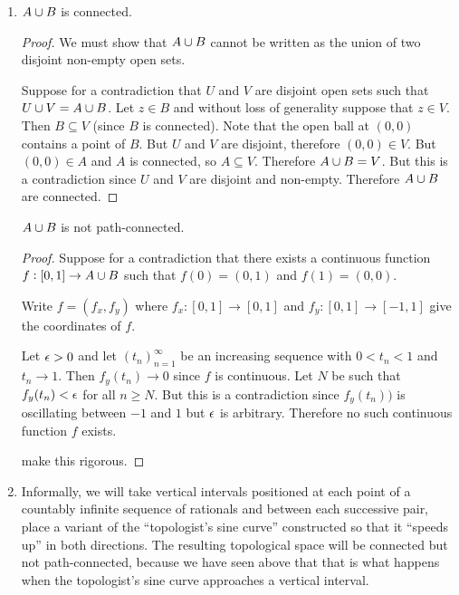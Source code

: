 \begin{enumerate}[label=(\alph*)]
\item
  \begin{claim*}
    $A \cup B$ is connected.
  \end{claim*}

  \begin{proof}
    We must show that $A \cup B$ cannot be written as the union of two disjoint non-empty open sets.

    Suppose for a contradiction that $U$ and $V$ are disjoint open sets such that $U \cup V = A \cup B$.
    Let $z \in B$ and without loss of generality suppose that $z \in V$. Then $B \subseteq V$ (since $B$ is
    connected). Note that the open ball at $(0, 0)$ contains a point of $B$. But $U$ and $V$ are disjoint,
    therefore $(0, 0) \in V$. But $(0, 0) \in A$ and $A$ is connected, so $A \subseteq V$.
    Therefore $A \cup B = V$. But this is a contradiction since $U$ and $V$ are disjoint and non-empty.
    Therefore $A \cup B$ are connected.
  \end{proof}


  \begin{claim*}
    $A \cup B$ is not path-connected.
  \end{claim*}

  \begin{proof}
    Suppose for a contradiction that there exists a continuous function $f: [0, 1] \to A \cup B$ such
    that $f(0) = (0, 1)$ and $f(1) = (0, 0)$.

    Write $f = (f_x, f_y)$ where $f_x: [0, 1] \to [0, 1]$ and $f_y: [0, 1] \to [-1, 1]$ give the coordinates of $f$.

    Let $\epsilon > 0$ and let $(t_n)_{n=1}^\infty$ be an increasing sequence with $0 < t_n < 1$ and $t_n \to 1$.
    Then $f_y(t_n) \to 0$ since $f$ is continuous. Let $N$ be such that $f_y(t_n) < \epsilon$ for all $n \geq N$. But
    this is a contradiction since $f_y (t_n))$ is oscillating between $-1$ and $1$ but $\epsilon$ is arbitrary.
    Therefore no such continuous function $f$ exists.

     make this rigorous.
  \end{proof}
\item

  Informally, we will take vertical intervals positioned at each point of a countably infinite sequence of
  rationals and between each successive pair, place a variant of the ``topologist's sine curve​'' constructed so
  that it ``speeds up​'' in both directions. The resulting topological space will be connected but not
  path-connected, because we have seen above that that is what happens when the topologist's sine curve
  approaches a vertical interval.


\end{enumerate}
